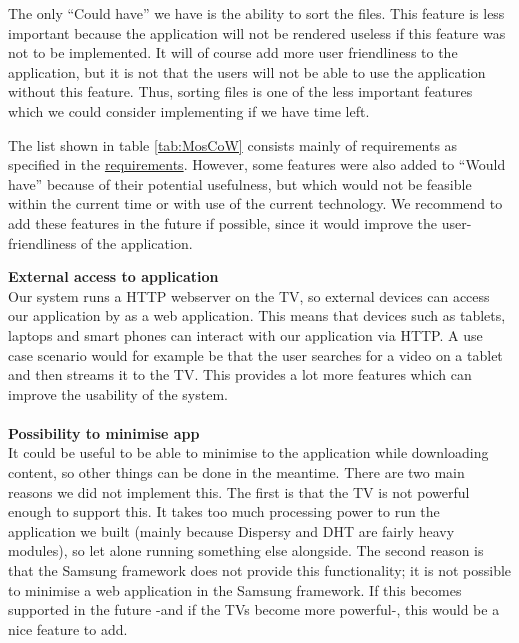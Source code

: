 The only ``Could have'' we have is the ability to sort the files. This feature is less 
important because the application will not be rendered useless
if this feature was not to be implemented. It will of course add more user friendliness to 
the application, but it is not that the users
 will not be able to use the application without this feature. Thus, sorting files is one of 
 the less important features which we could consider
 implementing if we have time left.
 
The list shown in table \ref{tab:MosCoW} consists mainly of requirements as specified in the 
\hyperref[sec:requirements]{requirements}.
However, some features were also added to ``Would have'' because of their potential 
usefulness, but which would not be feasible within the current time or with use of the 
current technology. We recommend to add these features in the future if possible, since it 
would improve the user-friendliness of the application.

\textbf{External access to application} \\
Our system runs a HTTP webserver on the TV, so external devices can access our application by as a web application.
This means that devices such as tablets, laptops and smart phones can interact with our application via HTTP.
A use case scenario would for example be that the user searches for a video on a tablet and then streams it to the TV.
This provides a lot more features which can improve the usability of the system.
\\\\
\textbf{Possibility to minimise app} \\
It could be useful to be able to minimise to the application while downloading content, so other things can be done in the meantime.
There are two main reasons we did not implement this. The first is that the TV is not powerful enough to support this. It takes too much
processing power to run the application we built (mainly because Dispersy and DHT\cite{dht} are fairly heavy modules), so let alone running something else alongside.
The second reason is that the Samsung framework does not provide this functionality; it is not possible to minimise a web application in the Samsung 
framework. If this becomes supported in the future -and if the TV\textquotesingle s become more powerful-, this would be a nice feature to add.

